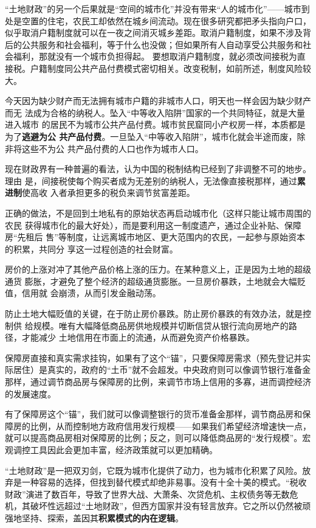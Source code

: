 “土地财政”的另一个后果就是“空间的城市化”并没有带来“人的城市化”——城市到处是空置的住宅，农民工却依然在城乡间流动。现在很多研究都把矛头指向户口，似乎取消户籍制度就可以在一夜之间消灭城乡差距。取消户籍制度，如果不涉及背后的公共服务和社会福利，等于什么也没做；但如果所有人自动享受公共服务和社会福利，那就没有一个城市负担得起。
要想取消户籍制度，就必须改间接税为直接税。户籍制度同公共产品付费模式密切相关。改变税制，如前所述，制度风险较大。

今天因为缺少财产而无法拥有城市户籍的非城市人口，明天也一样会因为缺少财产而无
法成为合格的纳税人。坠入“中等收入陷阱”国家的一个共同特征，就是大量进入城市
的居民不为城市公共产品付费。城市贫民窟同小产权房一样，本质都是为了\textbf{逃避为公
  共产品付费}。一旦坠入“中等收入陷阱”，城市化就会半途而废，除非将这些不为公
共产品付费的人口也作为城市人口。

现在财政界有一种普遍的看法，认为中国的税制结构已经到了非调整不可的地步。理由
是，间接税使每个购买者成为无差别的纳税人，无法像直接税那样，通过\textbf{累进制}使高收
入者承担更多的税负来调节贫富差距。

正确的做法，不是回到土地私有的原始状态再启动城市化（这样只能让城市周围的农民
获得城市化的最大好处），而是要利用这一制度遗产，通过企业补贴、保障房“先租后
售”等制度，让远离城市地区、更大范围内的农民，一起参与原始资本的积累，共同分
享这一过程创造的社会财富。

房价的上涨对冲了其他产品价格上涨的压力。在某种意义上，正是因为土地的超级通货
膨胀，才避免了整个经济的超级通货膨胀。一旦房价暴跌，土地就会大幅贬值，信用就
会崩溃，从而引发金融动荡。

防止土地大幅贬值的关键，在于防止房价暴跌。防止房价暴跌的有效办法，就是控制供
给规模。唯有大幅降低商品房供地规模并切断信贷从银行流向房地产的路径，才能减少
土地信用在市面上的流通，从而避免资产价格暴跌。

保障房直接和真实需求挂钩，如果有了这个“锚”，只要保障房需求（预先登记并实际居住）是真实的，政府的“土币”就不会超发。中央政府则可以像调节银行准备金那样，通过调节商品房与保障房的比例，来调节市场上信用的多寡，进而调控经济的发展速度。

有了保障房这个“锚”，我们就可以像调整银行的货币准备金那样，调节商品房和保障房的比例，从而控制地方政府信用发行规模——如果我们希望经济增速快一点，就可以提高商品房相对保障房的比例；反之，则可以降低商品房的“发行规模”。宏观调控工具因此会更加丰富，经济政策就可以更加精确。

“土地财政”是一把双刃剑，它既为城市化提供了动力，也为城市化积累了风险。放弃是一种容易的选择，但找到替代模式却绝非易事。没有十全十美的模式。“税收财政”演进了数百年，导致了世界大战、大萧条、次贷危机、主权债务等无数危机，其破坏性远超过“土地财政”，但西方国家并没有轻言放弃。它之所以仍然被顽强地坚持、探索，盖因其\textbf{积累模式的内在逻辑}。

